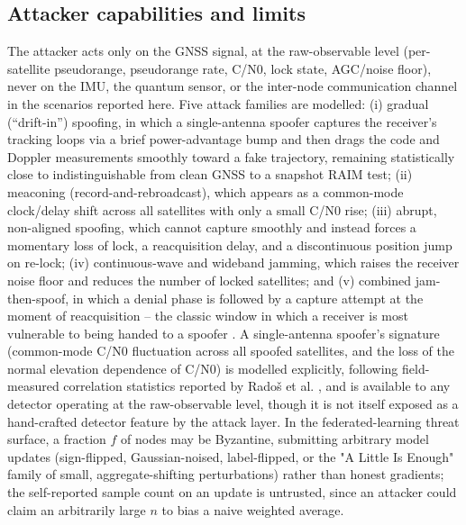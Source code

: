 \documentclass[journal]{IEEEtran}
\begin{document}
\subsection{Attacker capabilities and limits}
The attacker acts only on the GNSS signal, at the raw-observable level (per-satellite pseudorange,
pseudorange rate, C/N0, lock state, AGC/noise floor), never on the IMU, the quantum sensor, or the
inter-node communication channel in the scenarios reported here. Five attack families are modelled: (i)
gradual (``drift-in'') spoofing, in which a single-antenna spoofer captures the receiver's tracking loops
via a brief power-advantage bump and then drags the code and Doppler measurements smoothly toward a
fake trajectory, remaining statistically close to indistinguishable from clean GNSS to a snapshot RAIM
test; (ii) meaconing (record-and-rebroadcast), which appears as a common-mode clock/delay shift across
all satellites with only a small C/N0 rise; (iii) abrupt, non-aligned spoofing, which cannot capture
smoothly and instead forces a momentary loss of lock, a reacquisition delay, and a discontinuous
position jump on re-lock; (iv) continuous-wave and wideband jamming, which raises the receiver noise
floor and reduces the number of locked satellites; and (v) combined jam-then-spoof, in which a denial
phase is followed by a capture attempt at the moment of reacquisition -- the classic window in which a
receiver is most vulnerable to being handed to a spoofer \cite{psiaki2016gnss}. A single-antenna
spoofer's signature (common-mode C/N0 fluctuation across all spoofed satellites, and the loss of the
normal elevation dependence of C/N0) is modelled explicitly, following field-measured correlation
statistics reported by Radoš et al. \cite{rados2024recent}, and is available to any detector operating
at the raw-observable level, though it is not itself exposed as a hand-crafted detector feature by the
attack layer. In the federated-learning threat surface, a fraction $f$ of nodes may be Byzantine,
submitting arbitrary model updates (sign-flipped, Gaussian-noised, label-flipped, or the "A Little Is
Enough" family of small, aggregate-shifting perturbations) rather than honest gradients; the
self-reported sample count on an update is untrusted, since an attacker could claim an arbitrarily large
$n$ to bias a naive weighted average.
\end{document}
